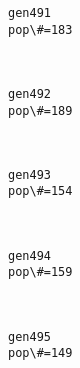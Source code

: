 \documentclass[11pt]{article}
\begin{document}
    \begin{Verbatim}[commandchars=\\\{\}]
gen491
pop\#=183

    \end{Verbatim}

    \begin{center}
    \end{center}
    { \hspace*{\fill} \\}
    
    \begin{Verbatim}[commandchars=\\\{\}]
gen492
pop\#=189

    \end{Verbatim}

    \begin{center}
    \end{center}
    { \hspace*{\fill} \\}
    
    \begin{Verbatim}[commandchars=\\\{\}]
gen493
pop\#=154

    \end{Verbatim}

    \begin{center}
    \end{center}
    { \hspace*{\fill} \\}
    
    \begin{Verbatim}[commandchars=\\\{\}]
gen494
pop\#=159

    \end{Verbatim}

    \begin{center}
    \end{center}
    { \hspace*{\fill} \\}
    
    \begin{Verbatim}[commandchars=\\\{\}]
gen495
pop\#=149

    \end{Verbatim}
\end{document}
